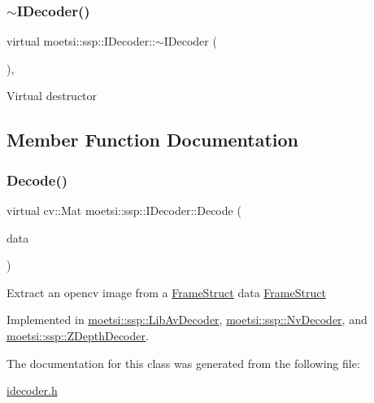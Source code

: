 \subsubsection{\texorpdfstring{$\sim$\+I\+Decoder()}{~IDecoder()}}
{\footnotesize\ttfamily virtual moetsi\+::ssp\+::\+I\+Decoder\+::$\sim$\+I\+Decoder (\begin{DoxyParamCaption}{ }\end{DoxyParamCaption})\hspace{0.3cm}{\ttfamily [inline]}, {\ttfamily [virtual]}}

Virtual destructor 

\subsection{Member Function Documentation}
\mbox{\label{classmoetsi_1_1ssp_1_1IDecoder_a1c06604dc4107d3668a4e791c13cc063}} 
\subsubsection{\texorpdfstring{Decode()}{Decode()}}
{\footnotesize\ttfamily virtual cv\+::\+Mat moetsi\+::ssp\+::\+I\+Decoder\+::\+Decode (\begin{DoxyParamCaption}\item[{\hyperlink{structmoetsi_1_1ssp_1_1FrameStruct}{Frame\+Struct} \&}]{data }\end{DoxyParamCaption})\hspace{0.3cm}{\ttfamily [pure virtual]}}

Extract an opencv image from a \hyperlink{structmoetsi_1_1ssp_1_1FrameStruct}{Frame\+Struct}  data \hyperlink{structmoetsi_1_1ssp_1_1FrameStruct}{Frame\+Struct} 

Implemented in \hyperlink{classmoetsi_1_1ssp_1_1LibAvDecoder_a4206a4581de1b93d6c6a0835e8cf4ac8}{moetsi\+::ssp\+::\+Lib\+Av\+Decoder}, \hyperlink{classmoetsi_1_1ssp_1_1NvDecoder_a78eb894b6825ac5ec57f5a4f4ecd7e31}{moetsi\+::ssp\+::\+Nv\+Decoder}, and \hyperlink{classmoetsi_1_1ssp_1_1ZDepthDecoder_a43226095658d616f7e38df1d43c2f88a}{moetsi\+::ssp\+::\+Z\+Depth\+Decoder}.



The documentation for this class was generated from the following file\+:\begin{DoxyCompactItemize}
\item 
\hyperlink{idecoder_8h}{idecoder.\+h}\end{DoxyCompactItemize}

